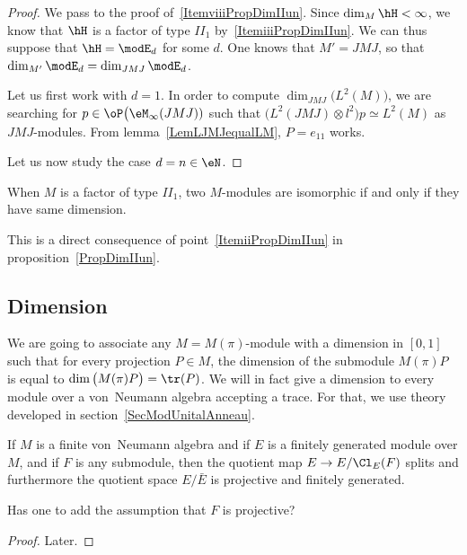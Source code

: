 \begin{proof}
	We pass to the proof of~\ref{ItemviiiPropDimIIun}. Since $\dim_M\hH<\infty$, we know that $\hH$ is a factor of type $II_1$ by~\ref{ItemiiiPropDimIIun}. We can thus suppose that $\hH=\modE_d$ for some $d$. One knows that $M'=JMJ$, so that $\dim_{M'}\modE_d=\dim_{JMJ}\modE_d$.

	Let us first work with $d=1$. In order to compute $\dim_{JMJ}\big( L^2(M) \big)$, we are searching for $p\in\oP\big(\eM_{\infty}(JMJ))$ such that $\big( L^2(JMJ)\otimes l^2 \big)p\simeq L^2(M)$ as $JMJ$-modules. From lemma~\ref{LemLJMJequalLM}, $P=e_{11}$ works.

	Let us now study the case $d=n\in\eN$.

\end{proof}

\begin{corollary}
	When $M$ is a factor of type $II_1$, two $M$-modules are isomorphic if and only if they have same dimension.
\end{corollary}
This is a direct consequence of point~\ref{ItemiiPropDimIIun} in proposition~\ref{PropDimIIun}.


					\subsection{Dimension}

We are going to associate any $M=M(\pi)$-module with a dimension in $[0,1]$ such that for every projection $P\in M$, the dimension of the submodule $M(\pi)P$ is equal to $\dim\big( M(\pi)P \big)=\tr(P)$. We will in fact give a dimension to every module over a von~Neumann algebra accepting a trace. For that, we use theory developed in section~\ref{SecModUnitalAnneau}.

\begin{theorem}			\label{ThofgsurMFSubEEClSplits}
If $M$ is a finite von~Neumann algebra and if $E$ is a finitely generated module over $M$, and if $F$ is any submodule, then the quotient map $E\to E/\Cl_E(F)$ splits and furthermore the quotient space $E/\bar E$ is projective and finitely generated.
\end{theorem}

\begin{probleme}
Has one to add the assumption that $F$ is projective?
\end{probleme}
\begin{proof}
Later.
\end{proof}

